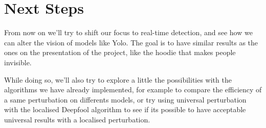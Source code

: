 \documentclass{article}
\begin{document}
\section{Next Steps}

From now on we'll try to shift our focus to real-time detection, and see how we can alter the vision of models like Yolo. The goal is to have similar results as the ones on the presentation of the project, like the hoodie that makes people invisible.

While doing so, we'll also try to explore a little the possibilities with the algorithms we have already implemented, for example to compare the efficiency of a same perturbation on differents models, or try using universal perturbation with the localised Deepfool algorithm to see if its possible to have acceptable universal results with a localised perturbation.
\end{document}
